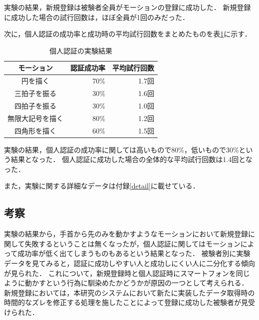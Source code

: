 \documentclass[11pt]{jreport}
\begin{document}
    実験の結果，新規登録は被験者全員がモーションの登録に成功した．
    新規登録に成功した場合の試行回数は，ほぼ全員が1回のみだった．

    次に，個人認証の成功率と成功時の平均試行回数をまとめたものを表\ref{authResult}に示す．

    \begin{table}[htb]
        \begin{center}
            \caption{個人認証の実験結果}
            \label{authResult}
            \begin{tabular}{|c|r|r|} \hline
                モーション & 認証成功率 & 平均試行回数 \\ \hline \hline
                円を描く & 70\% & 1.7回 \\ \hline
                三拍子を振る & 30\% & 1.6回 \\ \hline
                四拍子を振る & 30\% & 1.0回 \\ \hline
                無限大記号を描く & 80\% & 1.2回 \\ \hline
                四角形を描く & 60\% & 1.5回 \\ \hline
            \end{tabular}
        \end{center}
    \end{table}

    実験の結果，個人認証の成功率に関しては高いもので80\%，低いもので30\%という結果となった．
    個人認証に成功した場合の全体的な平均試行回数は1.4回となった．

    また，実験に関する詳細なデータは付録\ref{detail}に載せている．

    \subsection{考察} %
    実験の結果から，手首から先のみを動かすようなモーションにおいて新規登録に関して失敗するということは無くなったが，個人認証に関してはモーションによって成功率が低く出てしまうものもあるという結果となった．
    被験者別に実験データを見てみると，認証に成功しやすい人と成功しにくい人に二分化する傾向が見られた．
    これについて，新規登録時と個人認証時にスマートフォンを同じように動かすという行為に馴染めたかどうかが原因の一つとして考えられる．
    新規登録においては，本研究のシステムにおいて新たに実装したデータ取得時の時間的なズレを修正する処理を施したことによって登録に成功した被験者が見受けられた．
\end{document}
